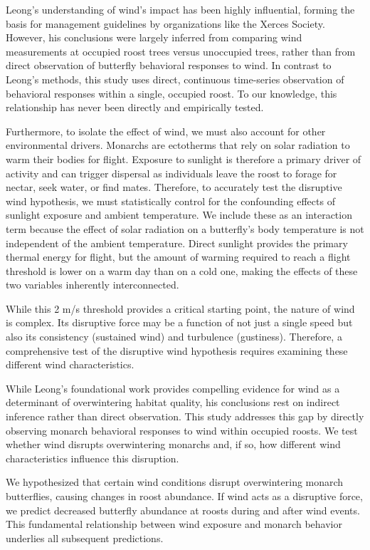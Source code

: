 Leong's understanding of wind's impact has been highly influential, forming the basis for management guidelines by organizations like the Xerces Society. However, his conclusions were largely inferred from comparing wind measurements at occupied roost trees versus unoccupied trees, rather than from direct observation of butterfly behavioral responses to wind. In contrast to Leong's methods, this study uses direct, continuous time-series observation of behavioral responses within a single, occupied roost. To our knowledge, this relationship has never been directly and empirically tested.

Furthermore, to isolate the effect of wind, we must also account for other environmental drivers. Monarchs are ectotherms that rely on solar radiation to warm their bodies for flight. Exposure to sunlight is therefore a primary driver of activity and can trigger dispersal as individuals leave the roost to forage for nectar, seek water, or find mates. Therefore, to accurately test the disruptive wind hypothesis, we must statistically control for the confounding effects of sunlight exposure and ambient temperature. We include these as an interaction term because the effect of solar radiation on a butterfly's body temperature is not independent of the ambient temperature. Direct sunlight provides the primary thermal energy for flight, but the amount of warming required to reach a flight threshold is lower on a warm day than on a cold one, making the effects of these two variables inherently interconnected.

While this 2 m/s threshold provides a critical starting point, the nature of wind is complex. Its disruptive force may be a function of not just a single speed but also its consistency (sustained wind) and turbulence (gustiness). Therefore, a comprehensive test of the disruptive wind hypothesis requires examining these different wind characteristics.

While Leong's foundational work provides compelling evidence for wind as a determinant of overwintering habitat quality, his conclusions rest on indirect inference rather than direct observation. This study addresses this gap by directly observing monarch behavioral responses to wind within occupied roosts. We test whether wind disrupts overwintering monarchs and, if so, how different wind characteristics influence this disruption.

We hypothesized that certain wind conditions disrupt overwintering monarch butterflies, causing changes in roost abundance. If wind acts as a disruptive force, we predict decreased butterfly abundance at roosts during and after wind events. This fundamental relationship between wind exposure and monarch behavior underlies all subsequent predictions.

